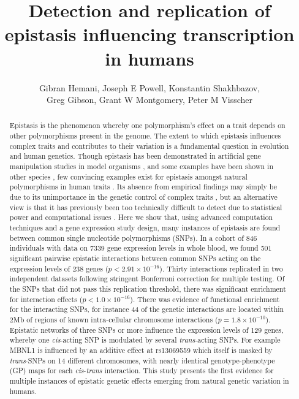 \documentclass{article}
\title{Detection and replication of epistasis influencing transcription in humans}
\date{}
\author{Gibran Hemani, Joseph E Powell, Konstantin Shakhbazov, \\
Greg Gibson, Grant W Montgomery, Peter M Visscher}
\begin{document}
\maketitle


\begin{abstract}
Epistasis is the phenomenon whereby one polymorphism's effect on a trait depends on other polymorphisms present in the genome. The extent to which epistasis influences complex traits \cite{Carlborg2004} and contributes to their variation \cite{Hill2008a, Crow2010} is a fundamental question in evolution and human genetics. Though epistasis has been demonstrated in artificial gene manipulation studies in model organisms \cite{Costanzo2010, Bloom2013}, and some examples have been shown in other species \cite{Carlborg2006}, few convincing examples exist for epistasis amongst natural polymorphisms in human traits \cite{Strange2010, Evans2011}. Its absence from empirical findings may simply be due to its unimportance in the genetic control of complex traits \cite{Hill2008a, Crow2010}, but an alternative view is that it has previously been too technically difficult to detect due to statistical power and computational issues \cite{Cordell2009}. Here we show that, using advanced computation techniques \cite{Hemani2011} and a gene expression study design, many instances of epistasis are found between common single nucleotide polymorphisms (SNPs). In a cohort of 846 individuals with data on 7339 gene expression levels in whole blood, we found 501 significant pairwise epistatic interactions between common SNPs acting on the expression levels of 238 genes ($p < 2.91 \times 10^{-16}$). Thirty interactions replicated in two independent datasets \cite{Metspalu2004, Fehrmann2011} following stringent Bonferroni correction for multiple testing. Of the SNPs that did not pass this replication threshold, there was significant enrichment for interaction effects ($p < 1.0 \times 10^{-16}$). There was evidence of functional enrichment for the interacting SNPs, for instance 44 of the genetic interactions are located within 2Mb of regions of known intra-cellular chromosome interactions \cite{Lieberman-Aiden2009} ($p = 1.8 \times 10^{-10}$). Epistatic networks of three SNPs or more influence the expression levels of 129 genes, whereby one \emph{cis}-acting SNP is modulated by several \emph{trans}-acting SNPs. For example MBNL1 is influenced by an additive effect at rs13069559 which itself is masked by \emph{trans}-SNPs on 14 different chromosomes, with nearly identical genotype-phenotype (GP) maps for each \emph{cis}-\emph{trans} interaction. This study presents the first evidence for multiple instances of epistatic genetic effects emerging from natural genetic variation in humans.

\end{abstract}
\end{document}

